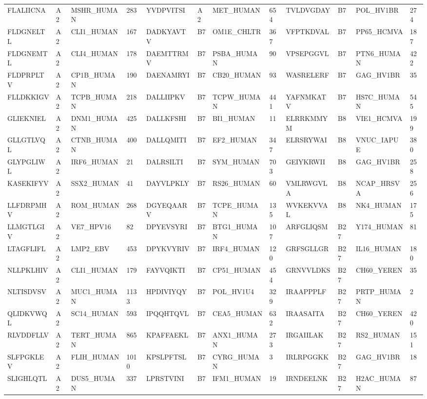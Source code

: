 \begin{table}[htp]
\begin{center}
\begin{sideways}
{\begin{tabulary}{1.5\textwidth}{|l|l|l|l|l|l|l|l|l|l|l|l|}
FLALIICNA & A2 & MSHR\_HUMAN & 283 & YVDPVITSI & A2 & MET\_HUMAN & 654 & TVLDVGDAY & B7 & POL\_HV1BR & 274 \\
FLDGNELTL & A2 & CLI1\_HUMAN & 167 & DADKYAVTV & B7 & OM1E\_CHLTR & 367 & VFPTKDVAL & B7 & PP65\_HCMVA & 187 \\
FLDGNEMTL & A2 & CLI4\_HUMAN & 178 & DAEMTTRMV & B7 & PSBA\_HUMAN & 90 & VPSEPGGVL & B7 & PTN6\_HUMAN & 422 \\
FLDPRPLTV & A2 & CP1B\_HUMAN & 190 & DAENAMRYI & B7 & CB20\_HUMAN & 93 & WASRELERF & B7 & GAG\_HV1BR & 35 \\
FLLDKKIGV & A2 & TCPB\_HUMAN & 218 & DALLIIPKV & B7 & TCPW\_HUMAN & 441 & YAFNMKATV & B7 & HS7C\_HUMAN & 545 \\
GLIEKNIEL & A2 & DNM1\_HUMAN & 425 & DALLKFSHI & B7 & BI1\_HUMAN & 11 & ELRRKMMYM & B8 & VIE1\_HCMVA & 199 \\
GLLGTLVQL & A2 & CTNB\_HUMAN & 400 & DALLQMITI & B7 & EF2\_HUMAN & 347 & ELRSRYWAI & B8 & VNUC\_IAPUE & 380 \\
GLYPGLIWL & A2 & IRF6\_HUMAN & 21 & DALRSILTI & B7 & SYM\_HUMAN & 703 & GEIYKRWII & B8 & GAG\_HV1BR & 258 \\
KASEKIFYV & A2 & SSX2\_HUMAN & 41 & DAYVLPKLY & B7 & RS26\_HUMAN & 60 & VMLRWGVLA & B8 & NCAP\_HRSVA & 256 \\
LLFDRPMHV & A2 & ROM\_HUMAN & 268 & DGYEQAARV & B7 & TCPE\_HUMAN & 135 & WVKEKVVAL & B8 & NK4\_HUMAN & 175 \\
LLMGTLGIV & A2 & VE7\_HPV16 & 82 & DPYEVSYRI & B7 & BTG1\_HUMAN & 107 & ARFGLIQSM & B27 & Y174\_HUMAN & 81 \\
LTAGFLIFL & A2 & LMP2\_EBV & 453 & DPYKVYRIV & B7 & IRF4\_HUMAN & 120 & GRFSGLLGR & B27 & IL16\_HUMAN & 180 \\
NLLPKLHIV & A2 & CLI1\_HUMAN & 179 & FAYVQIKTI & B7 & CP51\_HUMAN & 454 & GRNVVLDKS & B27 & CH60\_YEREN & 35 \\
NLTISDVSV & A2 & MUC1\_HUMAN & 1133 & HPDIVIYQY & B7 & POL\_HV1U4 & 329 & IRAAPPPLF & B27 & PRTP\_HUMAN & 2 \\
QLIDKVWQL & A2 & SC14\_HUMAN & 593 & IPQQHTQVL & B7 & CEA5\_HUMAN & 632 & IRAASAITA & B27 & CH60\_YEREN & 420 \\
RLVDDFLLV & A2 & TERT\_HUMAN & 865 & KPAFFAEKL & B7 & ANX1\_HUMAN & 273 & IRGAIILAK & B27 & RS2\_HUMAN & 151 \\
SLFPGKLEV & A2 & FLIH\_HUMAN & 1010 & KPSLPFTSL & B7 & CYRG\_HUMAN & 3 & IRLRPGGKK & B27 & GAG\_HV1BR & 18 \\
SLIGHLQTL & A2 & DUS5\_HUMAN & 337 & LPRSTVINI & B7 & IFM1\_HUMAN & 19 & IRNDEELNK & B27 & H2AC\_HUMAN & 87 \\

\end{tabulary}}
\end{sideways}
\end{center}
\end{table}

